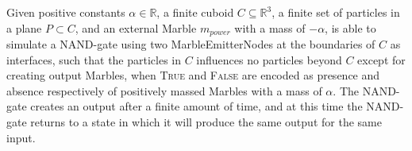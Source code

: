 \begin{lemma}
    Given positive constants $\alpha \in \mathbb{R}$, a finite cuboid $C \subseteq \mathbb{R}^3$, a finite set of particles in a plane $P \subset C$, and an external Marble $m_{power}$ with a mass of $-\alpha$, \nenwin is able to simulate a NAND-gate using two MarbleEmitterNodes at the boundaries of $C$ as interfaces, such that the particles in $C$ influences no particles beyond $C$ except for creating output Marbles, when \textsc{True} and \textsc{False} are encoded as presence and absence respectively of positively massed Marbles with a mass of $\alpha$. The NAND-gate creates an output after a finite amount of time, and at this time the NAND-gate returns to a state in which it will produce the same output for the same input.
    \label{lemma:nand_with_iface}
\end{lemma}
